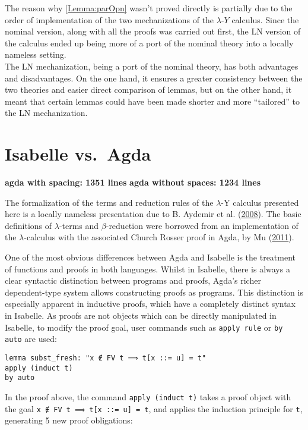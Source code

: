 \documentclass[a4paper, 12pt, twoside]{style/ociamthesis}
\theoremstyle{plain}
\theoremstyle{definition}
\theoremstyle{remark}
\newcommand{\lamy}{\lambda\text{-}Y}
\begin{document}
The reason why \cref{Lemma:parOpn} wasn't proved directly is partially
due to the order of implementation of the two mechanizations of the
\(\lamy\) calculus. Since the nominal version, along with all the proofs
was carried out first, the LN version of the calculus ended up being
more of a port of the nominal theory into a locally nameless setting.\\
The LN mechanization, being a port of the nominal theory, has both
advantages and disadvantages. On the one hand, it ensures a greater
consistency between the two theories and easier direct comparison of
lemmas, but on the other hand, it meant that certain lemmas could have
been made shorter and more ``tailored'' to the LN mechanization.

\chapter{Isabelle vs.~Agda}\label{comp-agda}

\label{chap:compAgda}

\textbf{agda with spacing: 1351 lines} \textbf{agda without spaces: 1234
lines}

The formalization of the terms and reduction rules of the \(\lambda\)-Y
calculus presented here is a locally nameless presentation due to B.
Aydemir et al. (\protect\hyperlink{ref-aydemir08}{2008}). The basic
definitions of \(\lambda\)-terms and \(\beta\)-reduction were borrowed
from an implementation of the \(\lambda\)-calculus with the associated
Church Rosser proof in Agda, by Mu
(\protect\hyperlink{ref-shing-cheng}{2011}).

One of the most obvious differences between Agda and Isabelle is the
treatment of functions and proofs in both languages. Whilst in Isabelle,
there is always a clear syntactic distinction between programs and
proofs, Agda's richer dependent-type system allows constructing proofs
as programs. This distinction is especially apparent in inductive
proofs, which have a completely distinct syntax in Isabelle. As proofs
are not objects which can be directly manipulated in Isabelle, to modify
the proof goal, user commands such as \texttt{apply rule} or
\texttt{by auto} are used:

\begin{verbatim}
lemma subst_fresh: "x ∉ FV t ⟹ t[x ::= u] = t"
apply (induct t)
by auto
\end{verbatim}

In the proof above, the command \texttt{apply (induct t)} takes a proof
object with the goal \texttt{x ∉ FV t ⟹ t[x ::= u] = t}, and applies the
induction principle for \texttt{t}, generating 5 new proof obligations:
\end{document}
